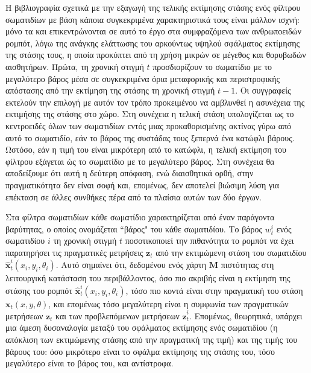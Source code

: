 Η βιβλιογραφία σχετικά με την εξαγωγή της τελικής εκτίμησης στάσης ενός φίλτρου
σωματιδίων με βάση κάποια συγκεκριμένα χαρακτηριστικά τους είναι μάλλον ισχνή:
μόνο τα \cite{Liemhetcharat2010} και \cite{Coltin2013} επικεντρώνονται σε αυτό
το έργο στα συμφραζόμενα των ανθρωποειδών ρομπότ, λόγω της ανάγκης ελάττωσης
του αρκούντως υψηλού σφάλματος εκτίμησης της στάσης τους, η οποία προκύπτει από
τη χρήση μικρών σε μέγεθος και θορυβωδών αισθητήρων.  Πρώτα, τη χρονική στιγμή
$t$ προσδιορίζουν το σωματίδιο με το μεγαλύτερο βάρος μέσα σε συγκεκριμένα όρια
μεταφορικής και περιστροφικής απόστασης από την εκτίμηση της στάσης τη χρονική
στιγμή $t-1$. Οι συγγραφείς εκτελούν την επιλογή με αυτόν τον τρόπο
προκειμένου να αμβλυνθεί η ασυνέχεια της εκτιμήσης της στάσης στο χώρο. Στη
συνέχεια η τελική στάση υπολογίζεται ως το κεντροειδές όλων των σωματιδίων
εντός μιας προκαθορισμένης ακτίνας γύρω από αυτό το σωματιδίο, εάν το βάρος της
συστάδας τους ξεπερνά ένα κατώφλι βάρους. Ωστόσο, εάν η τιμή του είναι
μικρότερη από το κατώφλι, η τελική εκτίμηση του φίλτρου εξάγεται ώς το
σωματίδιο με το μεγαλύτερο βάρος. Στη συνέχεια θα αποδείξουμε ότι αυτή η
δεύτερη απόφαση, ενώ διαισθητικά ορθή, στην πραγματικότητα δεν είναι σοφή και,
επομένως, δεν αποτελεί βιώσιμη λύση για επέκταση σε άλλες συνθήκες πέρα από τα
πλαίσια αυτών των δύο έργων.

Στα φίλτρα σωματιδίων κάθε σωματίδιο χαρακτηρίζεται από έναν παράγοντα
βαρύτητας, ο οποίος ονομάζεται ``βάρος" του κάθε σωματιδίου. Το βάρος $w_t^i$
ενός σωματιδίου $i$ τη χρονική στιγμή $t$ ποσοτικοποιεί την πιθανότητα το
ρομπότ να έχει παρατηρήσει τις πραγματικές μετρήσεις $\bm{z}_t$ από την
εκτιμώμενη στάση του σωματιδίου $\hat{\bm{x}}_t^i(x_i, y_i, \theta_i)$.
Αυτό σημαίνει ότι, δεδομένου ενός χάρτη $\bm{M}$ πιστότητας στη λειτουργική
κατάσταση του περιβάλλοντος, όσο πιο ακριβής είναι η εκτίμηση της στάσης του
ρομπότ $\hat{\bm{x}}_t^i(x_i, y_i, \theta_i)$, τόσο πιο κοντά είναι στην
πραγματική του στάση $\bm{x}_t(x,y,\theta)$, και επομένως τόσο
μεγαλύτερη είναι η συμφωνία των πραγματικών μετρήσεων $\bm{z}_t$ και των
προβλεπόμενων μετρήσεων $\hat{\bm{z}}_t^i$. Επομένως, θεωρητικά, υπάρχει μια
άμεση δυσαναλογία μεταξύ του σφάλματος εκτίμησης ενός σωματιδίου (η απόκλιση
των εκτιμώμενης στάσης από την πραγματική της τιμή) και της τιμής του βάρους
του: όσο μικρότερο είναι το σφάλμα εκτίμησης της στάσης του, τόσο μεγαλύτερο
είναι το βάρος του, και αντίστροφα.

